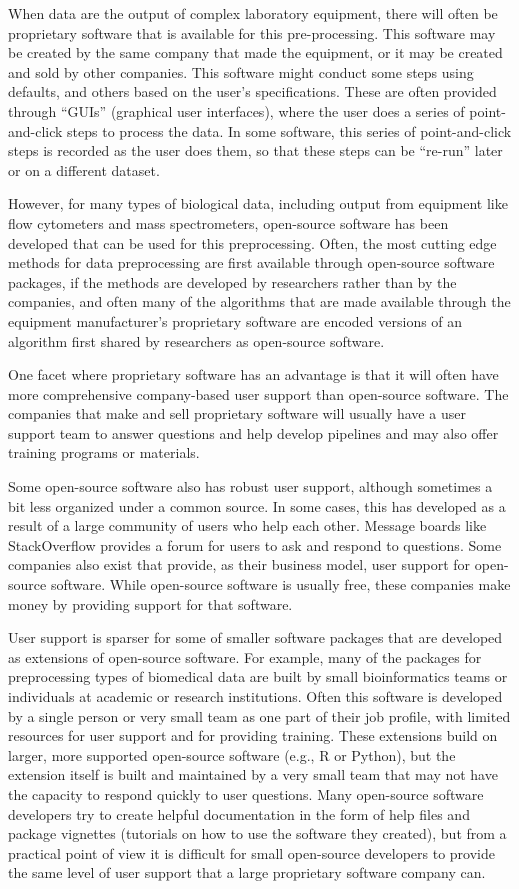 \documentclass[]{tufte-book}
\begin{document}
When data are the output of complex laboratory equipment, there will often be
proprietary software that is available for this pre-processing. This software
may be created by the same company that made the equipment, or it may be created
and sold by other companies. This software might conduct some steps using
defaults, and others based on the user's specifications. These are often
provided through ``GUIs'' (graphical user interfaces), where the user does a
series of point-and-click steps to process the data. In some software, this
series of point-and-click steps is recorded as the user does them, so that these
steps can be ``re-run'' later or on a different dataset.

However, for many types of biological data, including output from equipment like
flow cytometers and mass spectrometers, open-source software has been developed
that can be used for this preprocessing. Often, the most cutting edge methods
for data preprocessing are first available through open-source software
packages, if the methods are developed by researchers rather than by the
companies, and often many of the algorithms that are made available through the
equipment manufacturer's proprietary software are encoded versions of an
algorithm first shared by researchers as open-source software.

One facet where proprietary software has an advantage is that it will often have
more comprehensive company-based user support than open-source software. The
companies that make and sell proprietary software will usually have a user
support team to answer questions and help develop pipelines and may also offer
training programs or materials.

Some open-source software also has robust user support, although sometimes a bit
less organized under a common source. In some cases, this has developed as a
result of a large community of users who help each other. Message boards like
StackOverflow provides a forum for users to ask and respond to questions. Some
companies also exist that provide, as their business model, user support for
open-source software. While open-source software is usually free, these
companies make money by providing support for that software.

User support is sparser for some of smaller software packages that are developed
as extensions of open-source software. For example, many of the packages for
preprocessing types of biomedical data are built by small bioinformatics teams
or individuals at academic or research institutions. Often this software is
developed by a single person or very small team as one part of their job
profile, with limited resources for user support and for providing training.
These extensions build on larger, more supported open-source software (e.g., R
or Python), but the extension itself is built and maintained by a very small
team that may not have the capacity to respond quickly to user questions. Many
open-source software developers try to create helpful documentation in the form
of help files and package vignettes (tutorials on how to use the software they
created), but from a practical point of view it is difficult for small
open-source developers to provide the same level of user support that a large
proprietary software company can.
\end{document}
